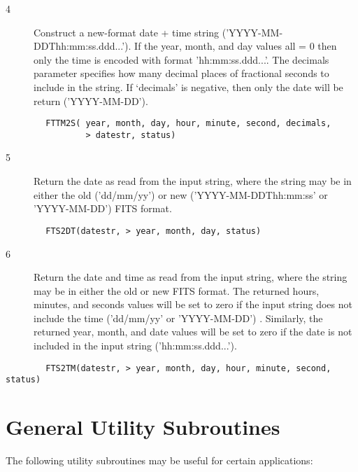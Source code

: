 \documentclass[11pt]{book}
\begin{document}
\begin{description}
\item[4 ] Construct a new-format date + time string ('YYYY-MM-DDThh:mm:ss.ddd...').
  If the year, month, and day values all = 0 then only the time is encoded
  with format 'hh:mm:ss.ddd...'.  The decimals parameter specifies how many
  decimal places of fractional seconds to include in the string.  If `decimals'
 is negative, then only the date will be return ('YYYY-MM-DD').
\end{description}

\begin{verbatim}
        FTTM2S( year, month, day, hour, minute, second, decimals,
                > datestr, status)
\end{verbatim}


\begin{description}
\item[5 ] Return the date as read from the input string, where the string may be
in either the old ('dd/mm/yy')  or new ('YYYY-MM-DDThh:mm:ss' or
'YYYY-MM-DD') FITS format.
\end{description}

\begin{verbatim}
        FTS2DT(datestr, > year, month, day, status)
\end{verbatim}


\begin{description}
\item[6 ] Return the date and time as read from the input string, where the
string may be in either the old  or new FITS format.  The returned hours,
minutes, and seconds values will be set to zero if the input string
does not include the time ('dd/mm/yy' or 'YYYY-MM-DD') .  Similarly,
the returned year, month, and date values will be set to zero if the
date is not included in the input string ('hh:mm:ss.ddd...').
\end{description}

\begin{verbatim}
        FTS2TM(datestr, > year, month, day, hour, minute, second, status)
\end{verbatim}


\section{General Utility Subroutines \label{FTGHAD}}

The following utility subroutines may be useful for certain applications:
\end{document}
